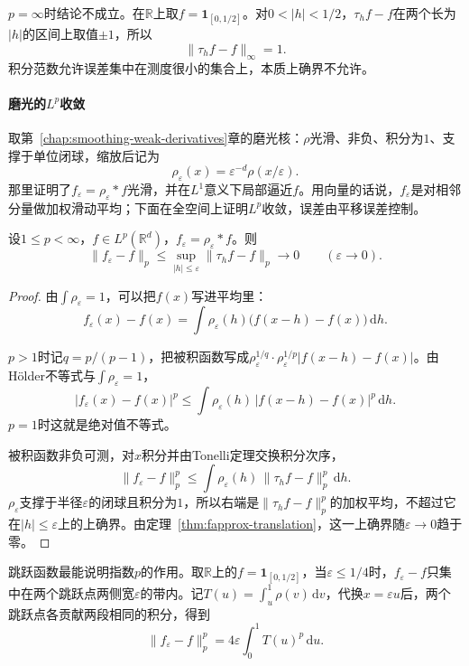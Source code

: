 $p=\infty$时结论不成立。在$\mathbb R$上取$f=\mathbf 1_{[0,1/2]}$。对$0<\lvert h\rvert<1/2$，$\tau_hf-f$在两个长为$\lvert h\rvert$的区间上取值$\pm1$，所以
\[
 \lVert\tau_hf-f\rVert_\infty=1 .
\]
积分范数允许误差集中在测度很小的集合上，本质上确界不允许。

\paragraph{磨光的$L^p$收敛}
取第~\ref{chap:smoothing-weak-derivatives}章的磨光核：$\rho$光滑、非负、积分为$1$、支撑于单位闭球，缩放后记为
\[
 \rho_\varepsilon(x)=\varepsilon^{-d}\rho(x/\varepsilon).
\]
那里证明了$f_\varepsilon=\rho_\varepsilon*f$光滑，并在$L^1$意义下局部逼近$f$。用向量的话说，$f_\varepsilon$是对相邻分量做加权滑动平均；下面在全空间上证明$L^p$收敛，误差由平移误差控制。

\begin{theorem}
\label{thm:fapprox-mollifier}
设$1\leq p<\infty$，$f\in L^p(\mathbb R^d)$，$f_\varepsilon=\rho_\varepsilon*f$。则
\begin{equation}
 \lVert f_\varepsilon-f\rVert_p\leq\sup_{\lvert h\rvert\leq\varepsilon}\lVert\tau_hf-f\rVert_p\to0\qquad(\varepsilon\to0).
 \label{eq:fapprox-mollifier-error}
\end{equation}
\end{theorem}

\begin{proof}
由$\int\rho_\varepsilon=1$，可以把$f(x)$写进平均里：
\[
 f_\varepsilon(x)-f(x)=\int\rho_\varepsilon(h)\bigl(f(x-h)-f(x)\bigr)\,\mathrm dh .
\]

$p>1$时记$q=p/(p-1)$，把被积函数写成$\rho_\varepsilon^{1/q}\cdot\rho_\varepsilon^{1/p}\lvert f(x-h)-f(x)\rvert$。由Hölder不等式与$\int\rho_\varepsilon=1$，
\[
 \lvert f_\varepsilon(x)-f(x)\rvert^p\leq\int\rho_\varepsilon(h)\,\lvert f(x-h)-f(x)\rvert^p\,\mathrm dh .
\]
$p=1$时这就是绝对值不等式。

被积函数非负可测，对$x$积分并由Tonelli定理交换积分次序，
\[
 \lVert f_\varepsilon-f\rVert_p^p\leq\int\rho_\varepsilon(h)\,\lVert\tau_hf-f\rVert_p^p\,\mathrm dh .
\]
$\rho_\varepsilon$支撑于半径$\varepsilon$的闭球且积分为$1$，所以右端是$\lVert\tau_hf-f\rVert_p^p$的加权平均，不超过它在$\lvert h\rvert\leq\varepsilon$上的上确界。由定理~\ref{thm:fapprox-translation}，这一上确界随$\varepsilon\to0$趋于零。
\end{proof}

跳跃函数最能说明指数$p$的作用。取$\mathbb R$上的$f=\mathbf 1_{[0,1/2]}$，当$\varepsilon\leq1/4$时，$f_\varepsilon-f$只集中在两个跳跃点两侧宽$\varepsilon$的带内。记$T(u)=\int_u^1\rho(v)\,\mathrm dv$，代换$x=\varepsilon u$后，两个跳跃点各贡献两段相同的积分，得到
\[
 \lVert f_\varepsilon-f\rVert_p^p=4\varepsilon\int_0^1T(u)^p\,\mathrm du .
\]

